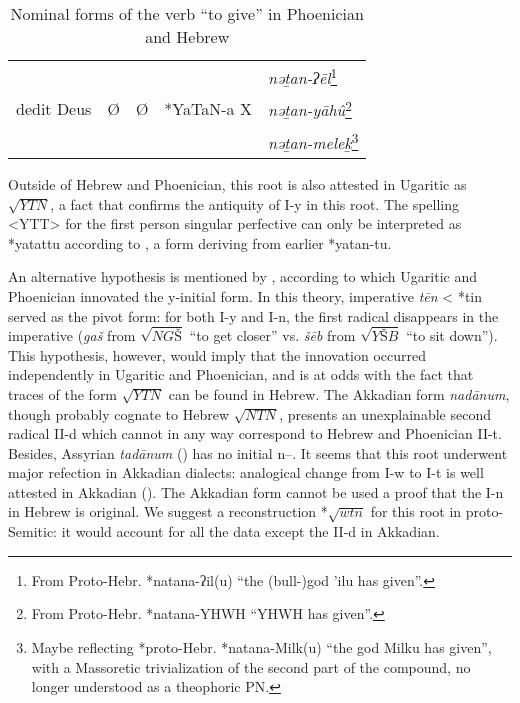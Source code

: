 \documentclass[oldfontcommands,oneside,a4paper,11pt]{article}
\newcommand{\racine}[1]{\begin{math}\sqrt{#1}\end{math}}
\newcommand{\forme}[1]{\textit{#1}}
\begin{document}
\begin{sloppypar}
\begin{table}
\begin{minipage}{12 cm}
\begin{tabular}{lllll}
&	&	&	&	\forme{nǝṯan-ʔēl}\footnote{From Proto-Hebr. *natana-ʔil(u) ``the (bull-)god ’ilu has given''.} \\
dedit Deus&	Ø&	Ø&	*YaTaN-a X&	\forme{nǝṯan-yāhû}\footnote{From Proto-Hebr. *natana-YHWH ``YHWH has given''.} \\
&	&	&	&	\forme{nǝṯan-meleḵ}\footnote{Maybe reflecting *proto-Hebr. *natana-Milk(u) ``the god Milku has given'', with a Massoretic trivialization of the second part of the compound, no longer understood as a theophoric PN.} \\
\bottomrule
  \end{tabular}\par
   \vspace{-0.75\skip\footins}
   \renewcommand{\footnoterule}{}
    \end{minipage}
      \caption{Nominal forms of the verb ``to give'' in Phoenician and Hebrew}\label{tab:donner}
\end{table}
 \normalsize
Outside of Hebrew and Phoenician, this root is also attested in Ugaritic as \racine{YTN}, a fact that confirms the antiquity of I-y in this root.  The spelling <YTT> for the first person singular perfective can only be interpreted as *yatattu according to \citet[I:69]{bordreuil04}, a form deriving from earlier *yatan-tu.



An alternative hypothesis is mentioned by \citet[469-1, fn. 57]{huehnergard06}, according to which Ugaritic and Phoenician innovated the y-initial form. In this theory,  imperative \forme{tēn} < *tin served as the pivot form: for both I-y and I-n, the first radical disappears in the imperative (\forme{gaš} from \racine{NGŠ} ``to get closer'' vs. \forme{šēb} from \racine{YŠB} ``to sit down''). This hypothesis, however, would imply that the innovation occurred independently in Ugaritic and Phoenician, and is at odds with the fact that traces of the form \racine{YTN} can be found in Hebrew. The Akkadian form \forme{nadānum}, though probably cognate to Hebrew \racine{NTN}, presents an unexplainable second radical II-d which cannot in any way correspond to Hebrew and Phoenician II-t. Besides, Assyrian \forme{tadānum} (\citealt[603]{huehnergard97}) has no initial n--. It seems  that this root underwent major refection in Akkadian dialects: analogical change from I-w to I-t is well attested in Akkadian (\citealt[464]{huehnergard06}). The Akkadian form cannot be used a proof that the I-n in Hebrew is original. We suggest a reconstruction *\racine{wtn} for this root in proto-Semitic: it would account for all the data except the II-d in Akkadian.


\end{sloppypar}
\end{document}
